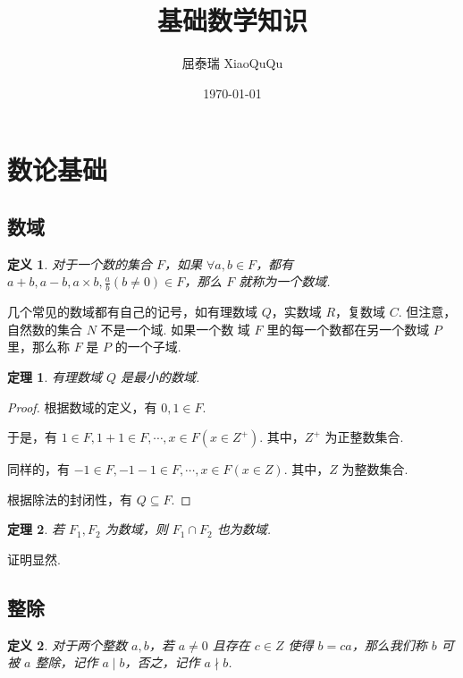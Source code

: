 \documentclass[a4paper]{article}
\title{基础数学知识}
\author{屈泰瑞 XiaoQuQu}
\date{\today}
\newtheorem{theorem}{定理}[section]
\newtheorem{definition}{定义}[section]
\begin{document}
\maketitle

\newpage

\section{数论基础}

\subsection{数域}

\begin{definition}
    对于一个数的集合 $F$，如果 $\forall a,b\in F$，都有 $a+b,a-b,a\times b,\frac
        {a}{b}(b\ne 0) \in F$，那么 $F$ 就称为一个数域.
\end{definition}

几个常见的数域都有自己的记号，如有理数域 $Q$，实数域 $R$，复数域 $C$. 但注意，自然数的集合 $N$ 不是一个域. 如果一个数
域 $F$ 里的每一个数都在另一个数域 $P$ 里，那么称 $F$ 是 $P$ 的一个子域.

\begin{theorem}
    有理数域 $Q$ 是最小的数域.
\end{theorem}

\begin{proof}
    根据数域的定义，有 $0,1\in F$.

    于是，有 $1\in F, 1+1\in F,\cdots, x\in F(x\in Z^+)$. 其中，$Z^+$ 为正整数集合.

    同样的，有 $-1\in F,-1-1\in F,\cdots, x\in F(x\in Z)$. 其中，$Z$ 为整数集合.

    根据除法的封闭性，有 $Q\subseteq F$.
\end{proof}

\begin{theorem}
    若 $F_1,F_2$ 为数域，则 $F_1 \cap F_2$ 也为数域.
\end{theorem}

证明显然.

\subsection{整除}

\begin{definition}
    对于两个整数 $a,b$，若 $a\ne 0$ 且存在 $c \in Z$ 使得 $b=ca$，那么我们称 $b$ 可被
    $a$ 整除，记作 $a\mid b$，否之，记作 $a \nmid b$.
\end{definition}
\end{document}
